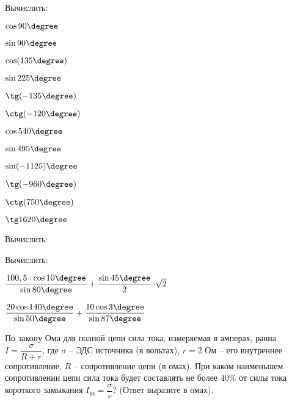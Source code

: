 \begin{homework}[number=1]
	\begin{listofex}
		\item Вычислить:
		\begin{enumcols}[itemcolumns=4]
			\item \( \cos90\degree \)
			\item \( \sin90\degree \)
			\item \( \cos(135\degree )\)
			\item \( \sin225\degree \)
			\item \( \tg(-135\degree) \)
			\item \( \ctg(-120\degree) \)
			\item \( \cos540\degree \)
			\item \( \sin495\degree \)
			\item \( \sin(-1125)\degree \)
			\item \( \tg(-960\degree) \)
			\item \( \ctg(750\degree) \)
			\item \( \tg1620\degree \)
		\end{enumcols}
		\item Вычислить:
		\begin{enumcols}[itemcolumns=3]
			\item {}
			\item {}
			\item {}
			\item {}
			\item {}
			\item {}
		\end{enumcols}
		\item Вычислить:
		\begin{enumcols}[itemcolumns=2]
			\item \( \dfrac{100,5\cdot\cos 10\degree}{\sin 80\degree}+\dfrac{\sin 45\degree}{2}\cdot\sqrt[]{2} \)
			\item \( \dfrac{20\cos140\degree}{\sin 50\degree}+\dfrac{10\cos 3\degree}{\sin 87\degree} \)
		\end{enumcols}
		\item По закону Ома для полной цепи сила тока, измеряемая в амперах, равна \( I=\dfrac{\sigma}{R+r} \), где \(\sigma\) – ЭДС источника (в вольтах), \(r=2\) Ом – его внутреннее сопротивление, \(R\) – сопротивление цепи (в омах). При каком наименьшем сопротивлении цепи сила тока будет составлять не более \(40\% \) от силы тока короткого замыкания \( I_{кз} =\dfrac{\sigma}{r}\)? (Ответ выразите в омах).

\end{listofex}
\end{homework}
